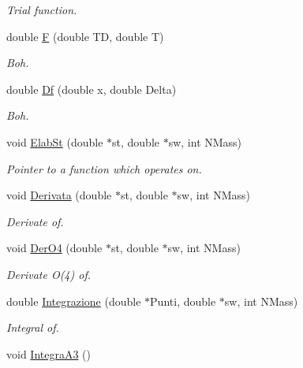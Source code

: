 \begin{DoxyCompactItemize}
\begin{DoxyCompactList}\small\item\em Trial function. \end{DoxyCompactList}\item 
double \hyperlink{classMatematica_a033b6eb7c18cac84239173ca4f210fed}{F} (double TD, double T)\hypertarget{classMatematica_a033b6eb7c18cac84239173ca4f210fed}{}\label{classMatematica_a033b6eb7c18cac84239173ca4f210fed}

\begin{DoxyCompactList}\small\item\em Boh. \end{DoxyCompactList}\item 
double \hyperlink{classMatematica_ad572ab06bc7d7c29e3f1043541f69da8}{Df} (double x, double Delta)\hypertarget{classMatematica_ad572ab06bc7d7c29e3f1043541f69da8}{}\label{classMatematica_ad572ab06bc7d7c29e3f1043541f69da8}

\begin{DoxyCompactList}\small\item\em Boh. \end{DoxyCompactList}\item 
void \hyperlink{classMatematica_aef286a585b6e7d30107ba8f36032e3ad}{Elab\+St} (double $\ast$st, double $\ast$sw, int N\+Mass)
\begin{DoxyCompactList}\small\item\em Pointer to a function which operates on. \end{DoxyCompactList}\item 
void \hyperlink{classMatematica_a6393bbfadafe6c13c2e94b79c7764d4b}{Derivata} (double $\ast$st, double $\ast$sw, int N\+Mass)
\begin{DoxyCompactList}\small\item\em Derivate of. \end{DoxyCompactList}\item 
void \hyperlink{classMatematica_a0ffa5ec4ebf021c7e8b2e79bed9524e1}{Der\+O4} (double $\ast$st, double $\ast$sw, int N\+Mass)
\begin{DoxyCompactList}\small\item\em Derivate O(4) of. \end{DoxyCompactList}\item 
double \hyperlink{classMatematica_a7f6e9a0a72348c10d08e388e75978d25}{Integrazione} (double $\ast$Punti, double $\ast$sw, int N\+Mass)
\begin{DoxyCompactList}\small\item\em Integral of. \end{DoxyCompactList}\item 
void \hyperlink{classMatematica_aa6998b41af5fad626bb70cc6fac6410e}{Integra\+A3} ()\hypertarget{classMatematica_aa6998b41af5fad626bb70cc6fac6410e}{}\label{classMatematica_aa6998b41af5fad626bb70cc6fac6410e}


\end{DoxyCompactItemize}

